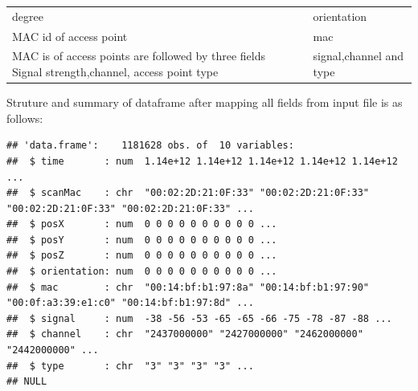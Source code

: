 \documentclass[
]{article}
\begin{document}
\begin{longtable}[]{@{}lcl@{}}
\begin{minipage}[t]{0.25\columnwidth}
degree\strut
\end{minipage} & \begin{minipage}[t]{0.22\columnwidth}\centering
1\strut
\end{minipage} & \begin{minipage}[t]{0.44\columnwidth}\raggedright
orientation\strut
\end{minipage}\tabularnewline
\begin{minipage}[t]{0.25\columnwidth}\raggedright
MAC id of access point\strut
\end{minipage} & \begin{minipage}[t]{0.22\columnwidth}\centering
1\strut
\end{minipage} & \begin{minipage}[t]{0.44\columnwidth}\raggedright
mac\strut
\end{minipage}\tabularnewline
\begin{minipage}[t]{0.25\columnwidth}\raggedright
MAC is of access points are followed by three fields Signal
strength,channel, access point type\strut
\end{minipage} & \begin{minipage}[t]{0.22\columnwidth}\centering
3\strut
\end{minipage} & \begin{minipage}[t]{0.44\columnwidth}\raggedright
signal,channel and type\strut
\end{minipage}\tabularnewline
\bottomrule
\end{longtable}

Struture and summary of dataframe after mapping all fields from input
file is as follows:

\begin{verbatim}
## 'data.frame':    1181628 obs. of  10 variables:
##  $ time       : num  1.14e+12 1.14e+12 1.14e+12 1.14e+12 1.14e+12 ...
##  $ scanMac    : chr  "00:02:2D:21:0F:33" "00:02:2D:21:0F:33" "00:02:2D:21:0F:33" "00:02:2D:21:0F:33" ...
##  $ posX       : num  0 0 0 0 0 0 0 0 0 0 ...
##  $ posY       : num  0 0 0 0 0 0 0 0 0 0 ...
##  $ posZ       : num  0 0 0 0 0 0 0 0 0 0 ...
##  $ orientation: num  0 0 0 0 0 0 0 0 0 0 ...
##  $ mac        : chr  "00:14:bf:b1:97:8a" "00:14:bf:b1:97:90" "00:0f:a3:39:e1:c0" "00:14:bf:b1:97:8d" ...
##  $ signal     : num  -38 -56 -53 -65 -65 -66 -75 -78 -87 -88 ...
##  $ channel    : chr  "2437000000" "2427000000" "2462000000" "2442000000" ...
##  $ type       : chr  "3" "3" "3" "3" ...
## NULL
\end{verbatim}
\end{document}
